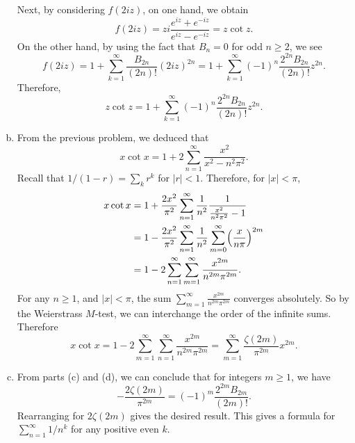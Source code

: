 \begin{pb}[4]
\begin{soln}
\begin{enumerate}[(a)]
        Next, by considering \(f(2iz)\), on one hand, we obtain
        \begin{equation*}
            f(2iz) = zi \frac{e^{iz} + e^{-iz}}{e^{iz} - e^{-iz}} = z \cot z.
        \end{equation*}
        On the other hand, by using the fact that \(B_n = 0\) for odd \(n \geq 2\), we see
        \begin{equation*}
            f(2iz) 
            = 1 + \sum_{k = 1}^{\infty} \frac{B_{2n}}{(2n)!} (2iz)^{2n}
            = 1 + \sum_{k = 1}^{\infty} (-1)^n \frac{2^{2n} B_{2n}}{(2n)!} z^{2n}.
        \end{equation*}
        Therefore,
        \begin{equation*}
            z \cot z = 1 + \sum_{k = 1}^{\infty} (-1)^n \frac{2^{2n} B_{2n}}{(2n)!} z^{2n}.
        \end{equation*}
    
    \item
        From the previous problem, we deduced that
        \begin{equation*}
            x \cot x = 1 + 2 \sum_{n = 1}^{\infty} \frac{x^2}{x^2 - n^2 \pi^2}.
        \end{equation*}
        Recall that \(1 / (1 - r) = \sum_{k}^{} r^k\) for \(|r| < 1\).
        Therefore, for \(|x| < \pi\),
        \begin{align*}
            x \cot x
            &= 1 + \frac{2x^2}{\pi^2} \sum_{n = 1}^{\infty} \frac{1}{n^2} \frac{1}{\frac{x^2}{n^2 \pi^2} - 1} \\
            &= 1 - \frac{2x^2}{\pi^2} \sum_{n = 1}^{\infty} \frac{1}{n^2} \sum_{m = 0}^{\infty} \lrb{\frac{x}{n\pi}}^{2m} \\
            &= 1 - 2 \sum_{n = 1}^{\infty} \sum_{m = 1}^{\infty} \frac{x^{2m}}{n^{2m}\pi^{2m}}.
        \end{align*}
        For any \(n \geq 1\), and \(|x| < \pi\), the sum
        \(\sum_{m = 1}^{\infty} \frac{x^{2m}}{n^{2m} \pi^{2m}}\) converges absolutely.
        So by the Weierstrass \(M\)-test,
        we can interchange the order of the infinite sums.
        Therefore
        \begin{equation*}
            x \cot x = 1 - 2 \sum_{m = 1}^{\infty} \sum_{n = 1}^{\infty} \frac{x^{2m}}{n^{2m}\pi^{2m}}
            = \sum_{m = 1}^{\infty} \frac{\zeta(2m)}{\pi^{2m}}x^{2m}.
        \end{equation*}
    
    \item
        From parts (c) and (d), we can conclude that for integers \(m \geq 1\), we have
        \begin{equation*}
            -\frac{2 \zeta(2m)}{\pi^{2m}} = (-1)^m \frac{2^{2m} B_{2m}}{(2m)!}.
        \end{equation*}
        Rearranging for \(2 \zeta(2m)\) gives the desired result.
        This gives a formula for \(\sum_{n = 1}^{\infty} 1 / n^k\) for any positive even \(k\).
        
    \end{enumerate}

\end{soln}
\end{pb}
